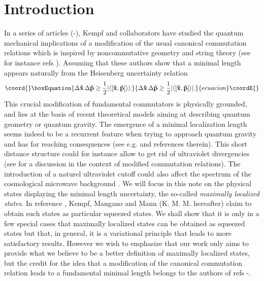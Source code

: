 \documentclass[a4paper,10pt]{article}
\providecommand{\x}{\mbox{\rm{\bf \^ x}}}
\providecommand{\p}{\mbox{\rm{\bf \^ p}}}
\providecommand{\KMM}{K. M. M. }
\begin{document}
\section{Introduction}
In a series of articles (\cite{K1}-\cite{K3}), Kempf and
collaborators have studied the quantum mechanical implications of
a modification of the usual canonical commutation relations which
is inspired by noncommutative geometry \cite{K3} and string theory
(see for instance refs \cite{stref}). Assuming that
\myHighlight{$[\x,\p]=if(\x,\p)$}\coordHE{} these authors show that a minimal length
appears naturally from the Heisenberg uncertainty relation
\begin{equation}\coord{}\boxEquation{
\Delta \x\,\Delta\p \geq\frac12|\langle[\x,\p]\rangle|.
\label{Heis}
}{
\Delta \x\,\Delta\p \geq\frac12|\langle[\x,\p]\rangle|.
}{ecuacion}\coordE{}\end{equation}
This crucial modification of fundamental commutators is physically
grounded, and lies at the basis of recent theoretical models
aiming at describing quantum geometry or quantum gravity. The
emergence of a minimal localization length seems indeed to be a
recurrent feature when trying to approach quantum gravity and has
far reaching consequences (see e.g. \cite{Garay} and references
therein). This short distance structure could for instance allow
to get rid of ultraviolet divergencies (see \cite{KeMa} for a
discussion in the context of modified commutation relations). The
introduction of a naturel ultraviolet cutoff could also affect the
spectrum of the cosmological microwave background \cite{K4,K5}. We
will focus in this note on the physical states displaying the
minimal length uncertainty, the so-called {\itshape maximally
localized states}. In reference \cite{K2} , Kempf, Mangano and
Mann (\KMM hereafter) claim to obtain such states as particular
squeezed states. We shall show that it is only in a few special
cases that maximally localized states can be obtained as squeezed
states but that, in general, it is a variational principle that
leads to more satisfactory results. However we wish to emphasize
that our work only aims to provide what we believe to be a better
definition of maximally localized states, but the credit for the
idea that a modification of the canonical commutation relation
leads to a fundamental minimal length belongs to the authors of
refs \cite{K1}-\cite{K3}.
\end{document}
